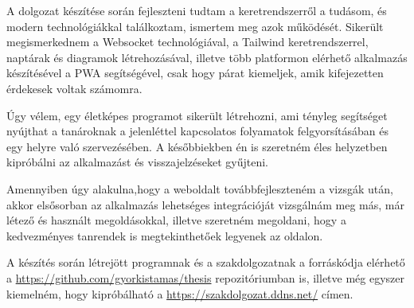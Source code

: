 \documentclass[
]{thesis-ekf}
\theoremstyle{definition}
\theoremstyle{remark}
\begin{document}
A dolgozat készítése során fejleszteni tudtam a keretrendszerről a tudásom, és modern technológiákkal találkoztam, ismertem meg azok működését. Sikerült megismerkednem a Websocket technológiával, a Tailwind keretrendszerrel, naptárak és diagramok létrehozásával, illetve több platformon elérhető alkalmazás készítésével a PWA segítségével, csak hogy párat kiemeljek, amik kifejezetten érdekesek voltak számomra.

Úgy vélem, egy életképes programot sikerült létrehozni, ami tényleg segítséget nyújthat a tanároknak a jelenléttel kapcsolatos folyamatok felgyorsításában és egy helyre való szervezésében. A későbbiekben én is szeretném éles helyzetben kipróbálni az alkalmazást és visszajelzéseket gyűjteni.

Amennyiben úgy alakulna,hogy a weboldalt továbbfejleszteném a vizsgák után, akkor elsősorban az alkalmazás lehetséges integrációját vizsgálnám meg más, már létező és használt megoldásokkal, illetve szeretném megoldani, hogy a kedvezményes tanrendek is megtekinthetőek legyenek az oldalon.

A készítés során létrejött programnak és a szakdolgozatnak a forráskódja elérhető a \url{https://github.com/gyorkistamas/thesis} repozitóriumban is, illetve még egyszer kiemelném, hogy kipróbálható a \url{https://szakdolgozat.ddns.net/} címen.
\end{document}
